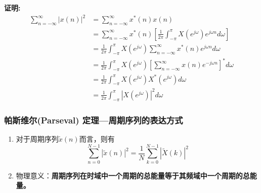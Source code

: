 \documentclass[notheorems,compress,mathserif,table]{beamer}
\begin{document}
\begin{frame}\frametitle{}%
\textbf{ 证明:}
\begin{equation*}
\begin{split}
\sum_{n=-\infty}^{\infty}|x(n)|^{2}
&= \sum_{n=-\infty}^{\infty}x^{*}(n)x(n)\\
&= \sum_{n=-\infty}^{\infty}x^{*}(n)\left[\frac{1}{2\pi}\int_{-\pi}^{\pi}X(e^{j\omega})e^{j\omega n}d\omega\right]\\
&= \frac{1}{2\pi}\int_{-\pi}^{\pi}X(e^{j\omega})\sum_{n=-\infty}^{\infty}x^{*}(n)e^{j\omega n}d\omega \\
&= \frac{1}{2\pi}\int_{-\pi}^{\pi}X(e^{j\omega})\left[\sum_{n=-\infty}^{\infty}x(n)e^{-j\omega n}\right]^{*}d\omega \\
&= \frac{1}{2\pi}\int_{-\pi}^{\pi}X(e^{j\omega})X^{*}(e^{j\omega})d\omega \\
&= \frac{1}{2\pi}\int_{-\pi}^{\pi}|X(e^{j\omega})|^{2}d\omega
\end{split}
\end{equation*}
\end{frame}



\begin{frame}\frametitle{帕斯维尔(Parseval) 定理—周期序列的表达方式}%

\begin{enumerate}
\item 对于周期序列$\tilde{x}(n)$而言，则有
\begin{equation*}
\sum_{n=0}^{N-1}|\tilde{x}(n)|^{2} = \frac{1}{N}\sum_{k=0}^{N-1}|\tilde{X}(k)|^{2}
\end{equation*}
\item 物理意义：\textbf{周期序列在时域中一个周期的总能量等于其频域中一个周期的总能量。}
\end{enumerate}
\end{frame}
\end{document}
